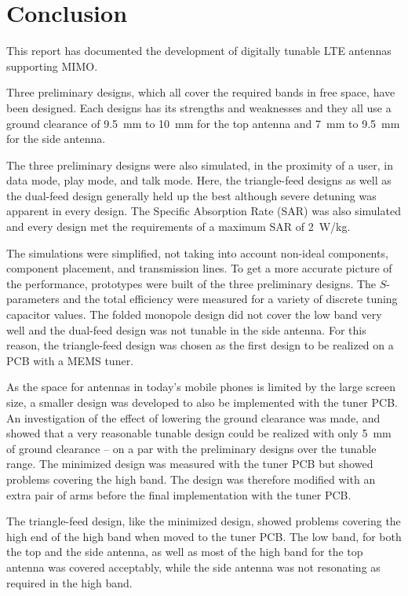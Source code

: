 \chapter{Conclusion}
\label{cha:conclusion}
This report has documented the development of digitally tunable LTE antennas supporting MIMO. 

Three preliminary designs, which all cover the required bands in free space, have been designed. Each designs has its strengths and weaknesses and they all use a ground clearance of \SI{9.5}{mm} to \SI{10}{mm} for the top antenna and \SI{7}{mm} to \SI{9.5}{mm} for the side antenna. 

The three preliminary designs were also simulated, in the proximity of a user, in data mode, play mode, and talk mode. Here, the triangle-feed designs as well as the dual-feed design generally held up the best although severe detuning was apparent in every design. The Specific Absorption Rate (SAR) was also simulated and every design met the requirements of a maximum SAR of \SI{2}{W/kg}.

The simulations were simplified, not taking into account non-ideal components, component placement, and transmission lines. To get a more accurate picture of the performance, prototypes were built of the three preliminary designs. The $S$-parameters and the total efficiency were measured for a variety of discrete tuning capacitor values. The folded monopole design did not cover the low band very well and the dual-feed design was not tunable in the side antenna. For this reason, the triangle-feed design was chosen as the first design to be realized on a PCB with a MEMS tuner.

As the space for antennas in today's mobile phones is limited by the large screen size, a smaller design was developed to also be implemented with the tuner PCB. An investigation of the effect of lowering the ground clearance was made, and showed that a very reasonable tunable design could be realized with only \SI{5}{mm} of ground clearance -- on a par with the preliminary designs over the tunable range. The minimized design was measured with the tuner PCB but showed problems covering the high band. The design was therefore modified with an extra pair of arms before the final implementation with the tuner PCB.

The triangle-feed design, like the minimized design, showed problems covering the high end of the high band when moved to the tuner PCB. The low band, for both the top and the side antenna, as well as most of the high band for the top antenna was covered acceptably, while the side antenna was not resonating as required in the high band.

